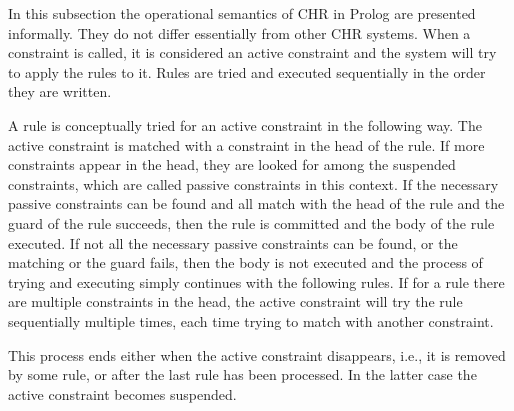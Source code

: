 \documentclass[thesis-solanki.tex]{subfiles}
\begin{document}
In this subsection the operational semantics of CHR
in Prolog are presented informally. They do not differ essentially from other CHR systems.
When a constraint
is called, it is considered an active constraint and the system will try to apply the rules to it. Rules are tried and executed sequentially in the order they are written.

\cite{website:swiprologsyntaxandsemantics}

A rule is conceptually tried for an active constraint in the following way.
The active constraint is matched with a constraint in the head of the rule.
If more constraints appear in the head, they are looked for among the suspended constraints, which are called
passive constraints in this context.
If the necessary passive constraints can be found and all match with the head of the rule and the guard of the rule
succeeds, then the rule is committed and the body of the rule executed.
If not all the necessary passive constraints can be found, or the matching or the guard fails, then the body is not
executed and the process of trying and executing simply continues with the following rules.
If for a rule there are multiple constraints in the head, the active constraint will try the rule sequentially
multiple times, each time trying to match with another constraint.

This process ends either when the active constraint disappears, i.e., it is removed by some rule, or
after the last rule has been processed.
In the latter case the active constraint becomes suspended.
\end{document}
